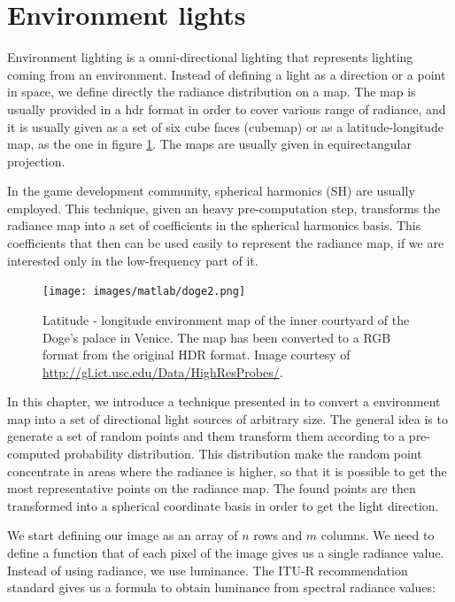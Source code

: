 \section{Environment lights}
\FloatBarrier

Environment lighting is a omni-directional lighting that represents lighting coming from an environment. Instead of defining a light as a direction or a point in space, we define directly the radiance distribution on a map. The map is usually provided in a hdr format in order to cover various range of radiance, and it is usually given as a set of six cube faces (cubemap) or as a latitude-longitude map, as the one in figure \ref{fig:doge}. The maps are usually given in equirectangular projection.

In the game development community, spherical harmonics (SH) \citep{green,peterpikeconference} are usually employed. This technique, given an heavy pre-computation step, transforms the radiance map into a set of coefficients in the spherical harmonics basis. This coefficients that then can be used easily to represent the radiance map, if we are interested only in the low-frequency part of it. 


\begin{figure}
\centering
\texttt{[image: images/matlab/doge2.png]}
\caption{Latitude - longitude environment map of the inner courtyard of the Doge's palace in Venice. The map has been converted to a RGB format from the original HDR format. Image courtesy of \url{http://gl.ict.usc.edu/Data/HighResProbes/}.}
\label{fig:doge}
\end{figure}


In this chapter, we introduce a technique presented in \cite{Pharr:2004:PBR:975275} to convert a environment map into a set of directional light sources of arbitrary size. The general idea is to generate a set of random points and them transform them according to a pre-computed probability distribution. This distribution make the random point concentrate in areas where the radiance is higher, so that it is possible to get the most representative points on the radiance map. The found points are then transformed into a spherical coordinate basis in order to get the light direction.

We start defining our image as an array of $n$ rows and $m$ columns. We need to define a function that of each pixel of the image gives us a single radiance value. Instead of using radiance, we use luminance. The ITU-R recommendation standard gives us a formula to obtain luminance from spectral radiance values:

